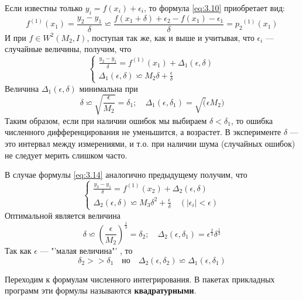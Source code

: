 Если известны только $y_i = f(x_i) + \epsilon_i$, то формула \ref{eq:3.10} приобретает вид:
\begin{dmath} \label{eq:3.10}
	f^{(1)}(x_1) = \frac{y_2 - y_1}{\delta} \backsimeq \frac{f(x_1 + \delta) + \epsilon_2 - f(x_1) - \epsilon_1}{\delta} = {p_2}^{(1)}(x_1)
\end{dmath}
И при $f \in W^2(M_2, I)$, поступая так же, как и выше и учитывая, что $\epsilon_i$ --- случайные величины, получим, что
\begin{dmath}
	\begin{cases}
		\frac{y_2 - y_1}{\delta} = f^{(1)}(x_1) + \Delta_1(\epsilon, \delta) \\
		\Delta_1(\epsilon, \delta) \backsimeq M_2\delta + \frac{\epsilon}{\delta}
	\end{cases}
\end{dmath}
Величина $\Delta_1(\epsilon, \delta)$ минимальна при
\begin{equation}
	\delta \backsimeq \sqrt{\frac{\epsilon}{M_2}} = \delta_1; \quad \Delta_1(\epsilon, \delta_1) = \sqrt(\epsilon M_2)
\end{equation}
Таким образом, если при наличии ошибок мы выбираем $\delta<\delta_1$, то ошибка численного дифференцирования не уменьшится, а возрастет. В эксперименте $\delta$ --- это интервал между измерениями, и т.о. при наличии шума (случайных ошибок) не следует мерить слишком часто.

В случае формулы \ref{eq:3.14} аналогично предыдущему получим, что
\begin{dmath}
	\begin{cases}
		\frac{y_3 - y_1}{\delta} = f^{(1)}(x_2) + \Delta_2(\epsilon, \delta) \\ 
		\Delta_2(\epsilon, \delta) \backsimeq M_3\delta^2 + \frac{\epsilon}{\delta} \quad (|\epsilon_i|<\epsilon)
	\end{cases}
\end{dmath}
Оптимальной является величина
\begin{equation}
	\delta \backsimeq {(\frac{\epsilon}{M_2})}^{\frac{1}{3}} = \delta_2; \quad \Delta_2(\epsilon, \delta_1) = \epsilon^{\frac{2}{3}} \delta^{\frac{1}{3}}
\end{equation}
Так как $\epsilon$ --- "'малая величина"' , то 
\begin{equation}
	\delta_2 >> \delta_1 \quad но \quad \Delta_2(\epsilon, \delta_2) \backsimeq \Delta_1(\epsilon, \delta_1)
\end{equation}

Переходим к формулам численного интегрирования. В пакетах прикладных программ эти формулы называются \textbf{квадратурными}.

